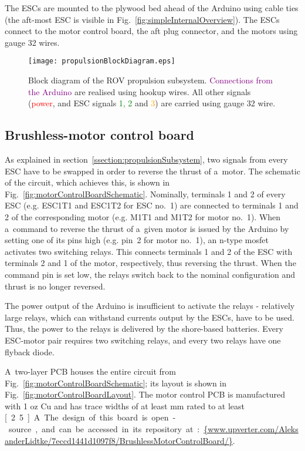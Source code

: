 The ESCs are mounted to the plywood bed ahead of the Arduino using cable ties (the aft-most ESC is visible in Fig.~\ref{fig:simpleInternalOverview}). The ESCs connect to the motor control board, the aft plug connector, and the motors using gauge 32 wires.

\begin{figure}[htb]
\begin{minipage}[b]{1\linewidth}
  \centering
	\texttt{[image: propulsionBlockDiagram.eps]}
\end{minipage}
\caption{Block diagram of the ROV propulsion subsystem. \textcolor{purple}{Connections from the Arduino} are realised using hookup wires. All other signals (\textcolor{red}{power}, and ESC signals \textcolor{green}{1, 2} and \textcolor{orange}{3}) are carried using gauge 32 wire.}
\label{fig:propulsionBlockDiagram}
\end{figure}

\subsection{Brushless-motor control board}\label{ssection:motorControlBoard}
As explained in section~\ref{ssection:propulsionSubsystem}, two signals from every ESC have to be swapped in order to reverse the thrust of a~motor. The schematic of the circuit, which achieves this, is shown in Fig.~\ref{fig:motorControlBoardSchematic}. Nominally, terminals 1 and 2 of every ESC (e.g. ESC1T1 and ESC1T2 for ESC no.~1) are connected to terminals 1 and 2 of the corresponding motor (e.g. M1T1 and M1T2 for motor no.~1). When a~command to reverse the thrust of a~given motor is issued by the Arduino by setting one of its pins high (e.g. pin~2 for motor no.~1), an n-type mosfet activates two switching relays. This connects terminals 1 and 2 of the ESC with terminals 2 and 1 of the motor, respectively, thus reversing the thrust. When the command pin is set low, the relays switch back to the nominal configuration and thrust is no longer reversed.

The power output of the Arduino is insufficient to activate the relays - relatively large relays, which can withstand currents output by the ESCs, have to be used. Thus, the power to the relays is delivered by the shore-based batteries. Every ESC-motor pair requires two switching relays, and every two relays have one flyback diode.

A~two-layer PCB houses the entire circuit from Fig.~\ref{fig:motorControlBoardSchematic}; its layout is shown in Fig.~\ref{fig:motorControlBoardLayout}. The motor control PCB is manufactured with 1 oz Cu and has trace widths of at least \unit[1]{mm} rated to at least \unit[2.5]{A}. The design of this board is open-source, and can be accessed in its repository at: \textcolor{blue}{\url{{www.upverter.com/AleksanderLidtke/7eccd1441d1097f8/BrushlessMotorControlBoard/}}}.

